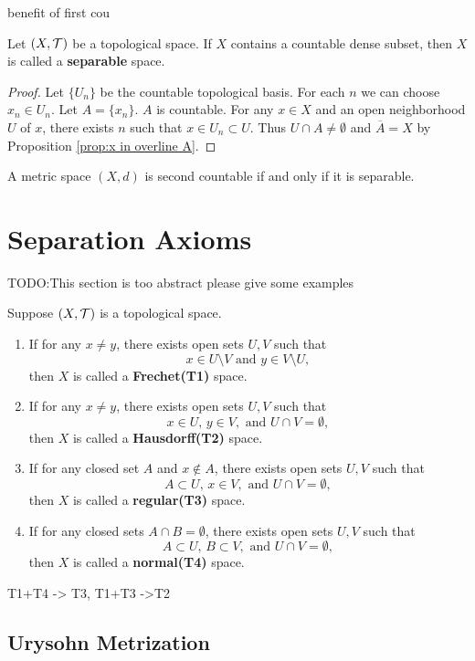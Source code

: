 benefit of first cou

\begin{definition}[Separability]
    Let $(X,\mathcal{T})$ be a topological space. If $X$ contains a countable dense subset, then $X$ is called a \textbf{separable} space.
\end{definition}

\begin{theorem}
    
\end{theorem}
\begin{proof}
    Let $\{U_n\}$ be the countable topological basis. For each $n$ we can choose $x_n\in U_n$. Let $A=\{x_n\}$. $A$ is countable.
    For any $x\in X$ and an open neighborhood $U$ of $x$, there exists $n$ such that $x\in U_n\subset U$. Thus $U\cap A\neq \emptyset$ and $\overline{A}=X$ by Proposition \ref{prop:x in overline A}.
\end{proof}

\begin{proposition}
    A metric space $(X,d)$ is second countable if and only if it is separable.
\end{proposition}

\section{Separation Axioms}

TODO:This section is too abstract please give some examples

\begin{definition}
    Suppose $(X,\mathcal{T})$ is a topological space.
    \begin{enumerate}
        \item If for any $x\neq y$, there exists open sets $U,V$ such that $$x\in U\setminus V\text{ and } y\in V\setminus U,$$
        then $X$ is called a \textbf{Frechet(T1)} space.
        \item If for any $x\neq y$, there exists open sets $U,V$ such that $$x\in U,\, y\in V,\text{ and } U\cap V=\emptyset,$$
        then $X$ is called a \textbf{Hausdorff(T2)} space.
        \item If for any closed set $A$ and $x\notin A$, there exists open sets $U,V$ such that $$A\subset U,\, x\in V,\text{ and }U\cap V=\emptyset,$$
        then $X$ is called a \textbf{regular(T3)} space.
        \item If for any closed sets $A\cap B=\emptyset$, there exists open sets $U,V$ such that $$A\subset U,\,B\subset V,\text{ and }U\cap V=\emptyset,$$
        then $X$ is called a \textbf{normal(T4)} space.
    \end{enumerate}
\end{definition}

T1+T4 -> T3, T1+T3 ->T2

\subsection{Urysohn Metrization}